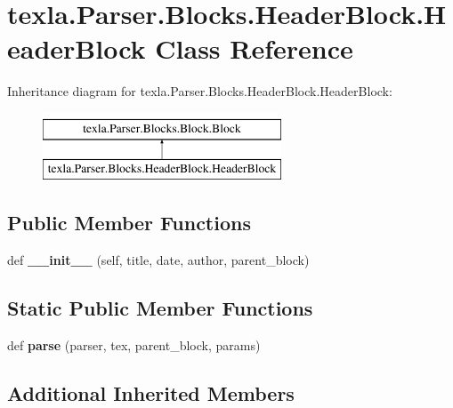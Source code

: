 \hypertarget{classtexla_1_1Parser_1_1Blocks_1_1HeaderBlock_1_1HeaderBlock}{}\section{texla.\+Parser.\+Blocks.\+Header\+Block.\+Header\+Block Class Reference}
\label{classtexla_1_1Parser_1_1Blocks_1_1HeaderBlock_1_1HeaderBlock}
Inheritance diagram for texla.\+Parser.\+Blocks.\+Header\+Block.\+Header\+Block\+:\begin{figure}[H]
\begin{center}
\leavevmode
\includegraphics[height=2.000000cm]{classtexla_1_1Parser_1_1Blocks_1_1HeaderBlock_1_1HeaderBlock}
\end{center}
\end{figure}
\subsection*{Public Member Functions}
\begin{DoxyCompactItemize}
\item 
\hypertarget{classtexla_1_1Parser_1_1Blocks_1_1HeaderBlock_1_1HeaderBlock_a7d9694b33f4546835215718b140a13b0}{}\label{classtexla_1_1Parser_1_1Blocks_1_1HeaderBlock_1_1HeaderBlock_a7d9694b33f4546835215718b140a13b0} 
def {\bfseries \+\_\+\+\_\+init\+\_\+\+\_\+} (self, title, date, author, parent\+\_\+block)
\end{DoxyCompactItemize}
\subsection*{Static Public Member Functions}
\begin{DoxyCompactItemize}
\item 
\hypertarget{classtexla_1_1Parser_1_1Blocks_1_1HeaderBlock_1_1HeaderBlock_a66a2af1f4724e15cc28c5593c37c4152}{}\label{classtexla_1_1Parser_1_1Blocks_1_1HeaderBlock_1_1HeaderBlock_a66a2af1f4724e15cc28c5593c37c4152} 
def {\bfseries parse} (parser, tex, parent\+\_\+block, params)
\end{DoxyCompactItemize}
\subsection*{Additional Inherited Members}


